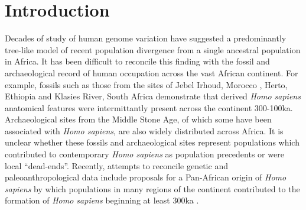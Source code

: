 \documentclass[]{article}
\begin{document}
\section*{Introduction}

Decades of study of human genome variation have suggested a predominantly
tree-like model of recent population divergence from a single ancestral
population in Africa. It has been difficult to reconcile this finding with the
fossil and archaeological record of human occupation across the vast African
continent. For example, fossils such as those from the sites of Jebel Irhoud,
Morocco \citep{Hublin2017-cq}, Herto, Ethiopia \citep{White2003-bk} and Klasies
River, South Africa \citep{Deacon1995-rx} demonstrate that derived \emph{Homo
sapiens} anatomical features were intermittantly present across the continent
300-100ka. Archaeological sites from the Middle Stone Age, of which some have
been associated with \emph{Homo sapiens}, are also widely distributed across
Africa. It is unclear whether these fossils and archaeological sites represent
populations which contributed to contemporary \emph{Homo sapiens} as population
precedents or were local ``dead-ends''. Recently, attempts to reconcile genetic
and paleoanthropological data include proposals for a Pan-African origin of
\emph{Homo sapiens} by which populations in many regions of the continent
contributed to the formation of \emph{Homo sapiens} beginning at least 300ka
\citep{Stringer2016-mj,Scerri2018-nl,Scerri2019-xg}.
\end{document}
